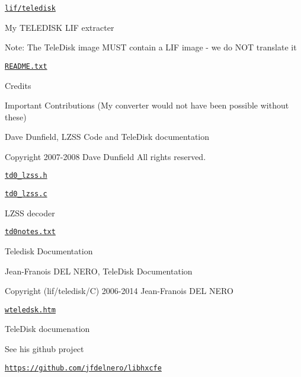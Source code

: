 \begin{DoxyItemize}
\item \href{lif/teledisk}{\tt lif/teledisk}
\begin{DoxyItemize}
\item My T\+E\+L\+E\+D\+I\+SK L\+IF extracter
\begin{DoxyItemize}
\item Note\+: The Tele\+Disk image M\+U\+ST contain a L\+IF image -\/ we do N\+OT translate it
\end{DoxyItemize}
\item \href{lif/teledisk/README.txt}{\tt R\+E\+A\+D\+M\+E.\+txt}
\begin{DoxyItemize}
\item Credits
\end{DoxyItemize}
\item Important Contributions (My converter would not have been possible without these)
\begin{DoxyItemize}
\item Dave Dunfield, L\+Z\+SS Code and Tele\+Disk documentation
\begin{DoxyItemize}
\item Copyright 2007-\/2008 Dave Dunfield All rights reserved.
\item \href{lif/teledisk/td0_lzss.h}{\tt td0\+\_\+lzss.\+h}
\item \href{lif/teledisk/td0_lzss.c}{\tt td0\+\_\+lzss.\+c}
\begin{DoxyItemize}
\item L\+Z\+SS decoder
\end{DoxyItemize}
\item \href{lif/teledisk/td0notes.txt}{\tt td0notes.\+txt}
\begin{DoxyItemize}
\item Teledisk Documentation
\end{DoxyItemize}
\end{DoxyItemize}
\item Jean-\/\+Franois D\+EL N\+E\+RO, Tele\+Disk Documentation
\begin{DoxyItemize}
\item Copyright (lif/teledisk/C) 2006-\/2014 Jean-\/\+Franois D\+EL N\+E\+RO
\begin{DoxyItemize}
\item \href{lif/teledisk/wteledsk.htm}{\tt wteledsk.\+htm}
\begin{DoxyItemize}
\item Tele\+Disk documenation
\end{DoxyItemize}
\item See his github project
\begin{DoxyItemize}
\item \href{https://github.com/jfdelnero/libhxcfe}{\tt https\+://github.\+com/jfdelnero/libhxcfe}
\end{DoxyItemize}
\end{DoxyItemize}
\end{DoxyItemize}
\end{DoxyItemize}
\end{DoxyItemize}
\end{DoxyItemize}

